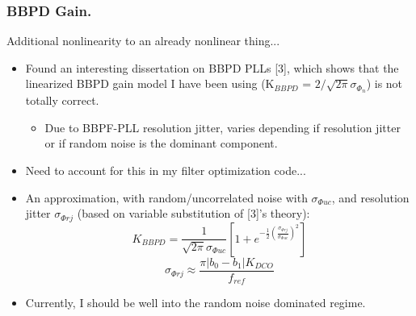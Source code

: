 \documentclass[t, screen, aspectratio=43]{beamer}
\begin{document}
\begin{frame}
	\frametitle{BBPD Gain.}
	\begin{block}{Additional nonlinearity to an already nonlinear thing...}
		\begin{minipage}{6cm}
			\vspace{1em}
			\tiny

			\begin{itemize}[itemsep=4pt,label=\protect---]
				\item Found an interesting dissertation on BBPD PLLs [3], which shows that the linearized BBPD gain model I have been using (K$_{BBPD}$ = $2/\sqrt{2\pi}\sigma_{\Phi_n}$) is not totally correct. 
				\begin{itemize}[itemsep=4pt,label=\protect$\bullet$]
						\item Due to BBPF-PLL resolution jitter, varies depending if resolution jitter or if random noise is the dominant component.
				\end{itemize}
				\item Need to account for this in my filter optimization code...
				\item An approximation, with random/uncorrelated noise with $\sigma_{\Phi uc}$, and resolution jitter $\sigma_{\Phi{rj}}$ (based on variable substitution of [3]'s theory):
				\begin{equation}
					K_{BBPD} = \frac{1}{\sqrt{2\pi}\sigma_{\Phi uc}}\left[1+ e^{-\frac{1}{2}\left(\frac{\sigma_{\Phi{rj}}}{\sigma_{\Phi uc}}\right)^2} \right]
				\end{equation}
					\begin{equation}
						\sigma_{\Phi rj} \approx \frac{\pi|b_0-b_1|K_{DCO}}{f_{ref}}
					\end{equation}
				\item Currently, I should be well into the random noise dominated regime.
			\end{itemize}


\end{minipage}
\end{block}
\end{frame}
\end{document}
